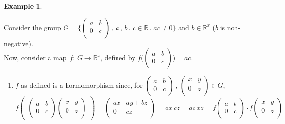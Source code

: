 \documentclass[11pt,a4paper]{article}
\theoremstyle{definition}
\newtheorem{exa}[thm]{Example}
\begin{document}
\begin{exa}
\begin{enumerate}
Consider the group $G  = \Big\{\begin{pmatrix}
a & b\\
0& c\\
\end{pmatrix}\, , \, a\, , \, b\, , \, c\in \mathbb{R}\, , \, ac\neq 0\Big\}$ and $b\in \mathbb{R}^x$ ($b$ is non-negative).\\
Now, consider a map $\, f:\, G\longrightarrow \mathbb{R}^x$, defined by $f\Big(\begin{pmatrix}
a & b\\
0 & c\\
\end{pmatrix}\Big) = ac$.
\begin{enumerate}
\item[$-$] $f$ as defined is a hormomorphism since, for $\begin{pmatrix}
a & b\\
0 & c\\
\end{pmatrix}\, , \, \begin{pmatrix}
x & y\\
0 & z\\
\end{pmatrix}\in G$, 
$$f\begin{pmatrix}
\begin{pmatrix}
a & b\\
0 & c\\
\end{pmatrix} \begin{pmatrix}
x & y \\
0 & z\\
\end{pmatrix}
\end{pmatrix} = \begin{pmatrix}
ax & ay + bz\\
0 & cz\\
\end{pmatrix} = ax \, cz = ac\, xz = f\begin{pmatrix}
a & b \\
0 & c\\
\end{pmatrix}\cdot f\begin{pmatrix}
x & y\\
0 & z\\
\end{pmatrix}$$\\


\end{enumerate}
\end{enumerate}
\end{exa}
\end{document}
